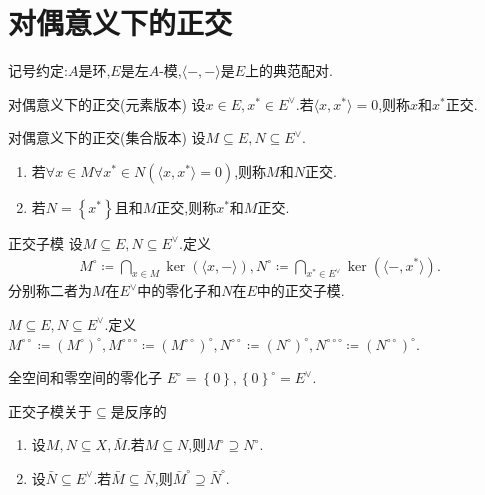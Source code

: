 \section{对偶意义下的正交}

记号约定:$A$是环,$E$是左$A$-模,$\langle -,-\rangle$是$E$上的典范配对.

\begin{definition}{对偶意义下的正交(元素版本)}{}
	设$x\in E,x^{\ast}\in E^{\vee}$.若$\langle x,x^{\ast}\rangle=0$,则称$x$和$x^{\ast}$正交.
\end{definition}

\begin{definition}{对偶意义下的正交(集合版本)}{}
	设$M\subseteq E,N\subseteq E^{\vee}$.
	\begin{enumerate}
		\item 若$\forall x\in M\forall x^{\ast}\in N\left(\langle x,x^{\ast}\rangle=0\right)$,则称$M$和$N$正交.
		\item 若$N=\left\{x^{\ast}\right\}$且和$M$正交,则称$x^{\ast}$和$M$正交.
	\end{enumerate}
\end{definition}

\begin{definition}{正交子模}{}
	设$M\subseteq E,N\subseteq E^{\vee}$.定义
	\begin{align*}
		M^{\circ}\coloneq\bigcap\limits_{x\in M}\ker\left(\langle x,-\rangle\right),N^{\circ}\coloneq\bigcap\limits_{x^{\ast}\in E^{\vee}}\ker\left(\langle -,x^{\ast}\rangle\right).
	\end{align*}
	分别称二者为$M$在$E^{\vee}$中的零化子和$N$在$E$中的正交子模.
\end{definition}

\begin{definition}{}{}
	$M\subseteq E,N\subseteq E^{\vee}$.定义$M^{\circ\circ}\coloneq\left(M^{\circ}\right)^{\circ},M^{\circ\circ\circ}\coloneq\left(M^{\circ\circ}\right)^{\circ},N^{\circ\circ}\coloneq\left(N^{\circ}\right)^{\circ},N^{\circ\circ\circ}\coloneq\left(N^{\circ\circ}\right)^{\circ}$.
\end{definition}

\begin{proposition}{全空间和零空间的零化子}{}
	$E^{\circ}=\left\{0\right\},\left\{0\right\}^{\circ}=E^{\vee}$.
\end{proposition}

\begin{proposition}{正交子模关于$\subseteq$是反序的}{}
	\begin{enumerate}
		\item 设$M,N\subseteq X,\bar{M}$.若$M\subseteq N$,则$M^{\circ}\supseteq N^{\circ}$.
		\item 设$\bar{N}\subseteq E^{\vee}$.若$\bar{M}\subseteq\bar{N}$,则$\bar{M}^{\circ}\supseteq\bar{N}^{\circ}$.
	\end{enumerate}
\end{proposition}

